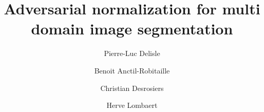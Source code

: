 \documentclass[preprint,12pt]{elsarticle}
\begin{document}
\begin{frontmatter}


\title{Adversarial normalization for multi domain image segmentation}






\author[1]{Pierre-Luc Delisle}



\address[1]{Ecole de technologie superieure, Montreal, Canada}

\author[1]{Benoit Anctil-Robitaille}
\author[1]{Christian Desrosiers}
\author[1]{Herve Lombaert}


\end{frontmatter}
\end{document}
